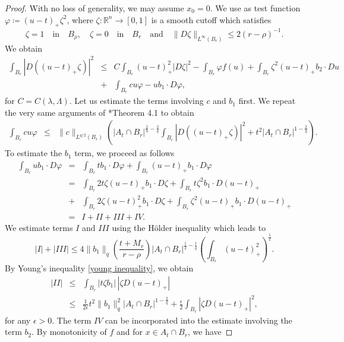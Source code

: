 \documentclass[12pt,a4paper]{amsart}
\numberwithin{equation}{section} %
\theoremstyle{definition}
\theoremstyle{remark}
\begin{document}
\begin{proof}
With no loss of generality, we may assume $x_0 = 0$. We use as test function $\varphi \coloneqq (u-t)_+\zeta^2$, where $\zeta \colon \mathbb{R}^n \to [0,1]$ is a smooth cutoff which satisfies
$$
    \zeta = 1 \quad \mbox{in} \quad B_\rho, \quad \zeta = 0 \quad \mbox{in} \quad B_r \quad \mbox{and} \quad \|D\zeta\|_{L^\infty(B_r)} \leq 2(r-\rho)^{-1}.  
$$
We obtain
\begin{eqnarray*}
    \int_{B_r}|D\left((u-t)_+\zeta \right)|^2 &\leq& C \int_{B_r} (u-t)_+^2|D\zeta|^2 - \int_{B_r} \varphi f(u) + \int_{B_r} \zeta^2 (u-t)_+ b_2 \cdot Du\\
    & + &  \int_{B_r}cu \varphi - ub_1 \cdot D\varphi, 
\end{eqnarray*}
for $C = C(\lambda,\Lambda)$. Let us estimate the terms involving $c$ and $b_1$ first. We repeat the very same arguments of \cite{Lin}*{Theorem 4.1} to obtain
\begin{eqnarray*}
    \int_{B_r}cu\varphi & \leq &  \|c\|_{L^{q/2}(B_r)}\left(|A_t\cap B_r|^{\frac{2}{n}-\frac{2}{q}}\int_{B_r}|D((u-t)_+\zeta)|^2 + t^2|A_t \cap B_r|^{1-\frac{2}{q}} \right).
\end{eqnarray*}
To estimate the $b_1$ term, we proceed as follows
\begin{eqnarray*}
    \int_{B_r} ub_1 \cdot D\varphi & = & \int_{B_r} tb_1 \cdot D\varphi + \int_{B_r} (u-t)_+b_1 \cdot D\varphi \\
    & = & \int_{B_r}2 t\zeta (u-t)_+ b_1 \cdot D\zeta + \int_{B_r} t\zeta^2 b_1 \cdot D(u-t)_+\\
    & + & \int_{B_r} 2\zeta (u-t)^2_+b_1 \cdot D\zeta + \int_{B_r} \zeta^2(u-t)_+ b_1 \cdot D(u-t)_+\\
    & = & I + II + III + IV.
\end{eqnarray*}
We estimate terms $I$ and $III$ using the H\"older inequality which leads to 
$$
    |I| + |III| \leq 4\|b_1\|_{q}\left(\frac{t+M_r}{r-\rho}\right)|A_t \cap B_r|^{\frac{1}{2}-\frac{1}{q}} \left(\int_{B_r}(u-t)_+^2\right)^{\frac{1}{2}}.
$$
By Young's inequality \eqref{young inequality}, we obtain
\begin{eqnarray*}
    |II| & \leq & \int_{B_r}|t\zeta b_1|\,|\zeta D(u-t)_+|\\
    & \leq & \frac{1}{2\epsilon}t^2\|b_1\|^2_{q}|A_t \cap B_r|^{1 - \frac{2}{q}} + \frac{\epsilon}{2} \int_{B_r}|\zeta D(u-t)_+|^2,
\end{eqnarray*}
for any $\epsilon > 0$. The term $IV$ can be incorporated into the estimate involving the term $b_2$. By monotonicity of $f$ and for $x \in A_t \cap B_r$, we have

\end{proof}
\end{document}
